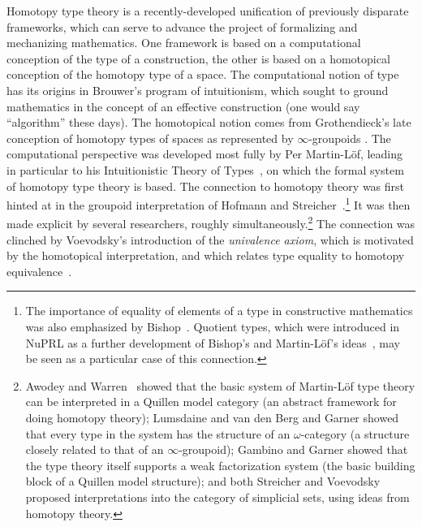 \documentclass[11pt]{article}
\begin{document}
\noindent Homotopy type theory is a recently-developed unification of previously disparate frameworks, which can serve
to advance the project of formalizing and mechanizing mathematics.  One framework is based on a computational conception
of the type of a construction, the other is based on a homotopical conception of the homotopy type of a space.  
The computational notion of type has its origins in Brouwer's program of intuitionism, which sought to ground
mathematics in the concept of an effective construction (one would say ``algorithm'' these days).  The homotopical
notion comes from Grothendieck's late conception of  homotopy types of spaces as represented by $\infty$-groupoids
\cite{GrothPS}.  The computational perspective was developed most fully by Per Martin-L\"{o}f, leading in particular to
his Intuitionistic Theory of Types~\cite{mltt}, on which the formal system of homotopy type theory is based. The
connection to homotopy theory was first hinted at in the groupoid interpretation of Hofmann and
Streicher~\cite{HS,HofmannM:gromtt}.\footnote{The importance of equality of
elements of a type in constructive mathematics was also emphasized by
Bishop~\cite{bishop:ca}.  Quotient types, which were introduced in NuPRL as a
  further development of Bishop's and Martin-L\"{o}f's ideas~\cite{NuPRL}, may
  be seen as a particular case of this connection.}    It was then made explicit by several researchers, roughly
simultaneously.\footnote{%
  Awodey and Warren~\cite{AW} showed that the basic system of Martin-L\"{o}f type theory can be interpreted in a Quillen
  model category (an abstract framework for doing homotopy theory); Lumsdaine \cite{L} and van den Berg and Garner
  \cite{vandenBergB:typwg} showed that every type in the system has the structure of an $\omega$-category (a structure
  closely related to that of an $\infty$-groupoid); Gambino and Garner \cite{GG} showed that the type theory itself
  supports a weak factorization system (the basic building block of a Quillen model structure); and both Streicher
  \cite{StreicherNote} and Voevodsky \cite{VVnote} proposed interpretations into the category of simplicial sets, using
  ideas from homotopy theory.}  The connection was clinched by Voevodsky's introduction of the \emph{univalence axiom},
which is motivated by the homotopical interpretation, and which relates type equality to homotopy equivalence~\cite{KLV,APW}.
\end{document}
